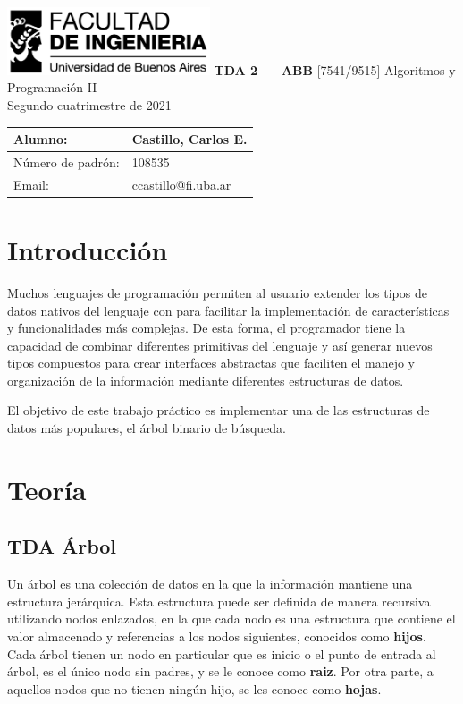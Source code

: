 \documentclass[titlepage,a4paper]{article}
\makeatletter
\newcommand{\FirstName}{Carlos E.}
\newcommand{\LastName}{Castillo}
\newcommand{\StudentID}{108535}
\newcommand{\StudentEmail}{ccastillo@fi.uba.ar}
\newcommand{\ProjectName}{TDA 2 — ABB}
\makeatother
\begin{document}
\begin{titlepage}
	\hfill\includegraphics[width=6cm]{logofiuba.jpg}
    \centering
    \vfill
    \Huge \textbf{\ProjectName}
    \vskip2cm
    \Large [7541/9515] Algoritmos y Programación II\\
    Segundo cuatrimestre de 2021 
    \vfill
    \begin{tabular}{ | l | l | }
      \hline
      Alumno: & \LastName, \FirstName \\ \hline
      Número de padrón: & \StudentID \\ \hline
      Email: & \StudentEmail \\ \hline
  	\end{tabular}
    \vfill
    \vfill
\end{titlepage}

\tableofcontents
\newpage


										\section{Introducción}\label{sec:intro}

Muchos lenguajes de programación permiten al usuario extender los tipos de
datos nativos del lenguaje con para facilitar la implementación de
características y funcionalidades más complejas.  De esta forma, el programador
tiene la capacidad de combinar diferentes primitivas del lenguaje y así generar
nuevos tipos compuestos para crear interfaces abstractas que faciliten el
manejo y organización de la información mediante diferentes estructuras de
datos.

El objetivo de este trabajo práctico es implementar una de las estructuras de
datos más populares, el árbol binario de búsqueda.


											 \section{Teoría}\label{sec:teoria}

														 \subsection{TDA Árbol}

Un árbol es una colección de datos en la que la información mantiene una
estructura jerárquica. Esta estructura puede ser definida de manera recursiva
utilizando nodos enlazados, en la que cada nodo es una estructura que contiene
el valor almacenado y referencias a los nodos siguientes, conocidos como
\textbf{hijos}. Cada árbol tienen un nodo en particular que es inicio o el
punto de entrada al árbol, es el único nodo sin padres, y se le conoce como
\textbf{raiz}. Por otra parte, a aquellos nodos que no tienen ningún hijo, se
les conoce como \textbf{hojas}.
\end{document}
